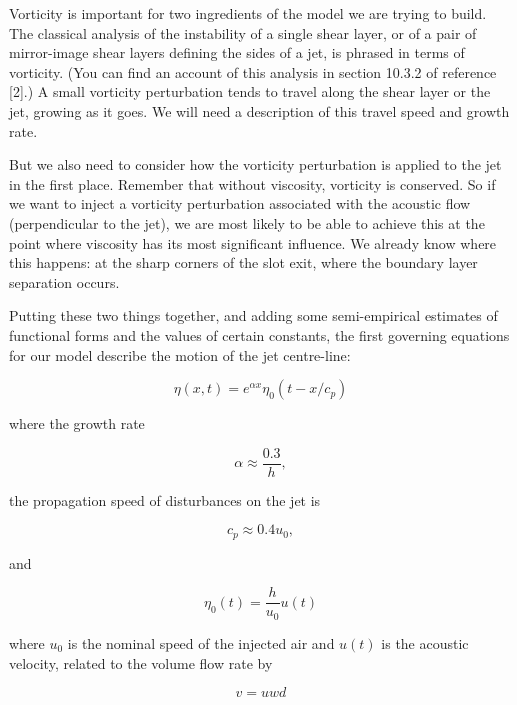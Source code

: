   Vorticity is important for two ingredients of the model we are trying to 
  build. The classical analysis of the instability of a single shear layer, or 
  of a pair of mirror-image shear layers defining the sides of a jet, is 
  phrased in terms of vorticity. (You can find an account of this analysis in 
  section 10.3.2 of reference [2].) A small vorticity perturbation tends to 
  travel along the shear layer or the jet, growing as it goes. We will need a 
  description of this travel speed and growth rate. 

  But we also need to consider how the vorticity perturbation is applied to the 
  jet in the first place. Remember that without viscosity, vorticity is 
  conserved. So if we want to inject a vorticity perturbation associated with 
  the acoustic flow (perpendicular to the jet), we are most likely to be able 
  to achieve this at the point where viscosity has its most significant 
  influence. We already know where this happens: at the sharp corners of the 
  slot exit, where the boundary layer separation occurs. 

  Putting these two things together, and adding some semi-empirical estimates 
  of functional forms and the values of certain constants, the first governing 
  equations for our model describe the motion of the jet centre-line: 

  \begin{equation*}\eta(x,t)=e^{\alpha x} \eta_0(t-x/c_p) 
  \tag{1}\end{equation*} 

  \noindent{}where the growth rate 

  \begin{equation*}\alpha \approx \dfrac{0.3}{h}, \tag{2}\end{equation*} 

  \noindent{}the propagation speed of disturbances on the jet is 

  \begin{equation*}c_p \approx 0.4 u_0 , \tag{3}\end{equation*} 

  \noindent{}and 

  \begin{equation*}\eta_0(t)=\dfrac{h}{u_0} u(t) \tag{4}\end{equation*} 

  \noindent{}where $u_0$ is the nominal speed of the injected air and $u(t)$ is 
  the acoustic velocity, related to the volume flow rate by 

  \begin{equation*}v=u w d \tag{5}\end{equation*} 

